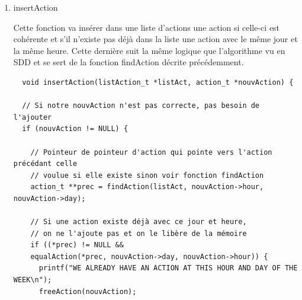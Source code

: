 \documentclass[11pt]{article}
\begin{document}
\begin{enumerate}
\begin{lstlisting}
   action_t **findAction(listAction_t *listAct, char hour[2], char day) {
  action_t **prec =
      NULL; // Pointeur d'un pointeur contenant l'action précédente
  if (checkHour(hour) && checkDay(day)) {
    prec = listAct;
    action_t *curr = *listAct; // Un pointeur vers notre action actuelle

    // Tant qu'on n'a pas trouvé l'action voulue et qu'on est avant
    // chronologiquement
    while (curr && compareAction(curr, day, hour)) {
      prec = &(curr->suiv);
      curr = curr->suiv;
    }
  }
  return prec;
}
\end{lstlisting}


\item insertAction
\label{sec:org713f212}

Cette fonction va insérer dans une liste d'actions une action si celle-ci
est cohérente et s'il n'existe pas déjà dans la liste une action avec le
même jour et la même heure.
Cette dernière suit la même logique que l'algorithme vu en SDD et se sert
de la fonction findAction décrite précédemment.

\begin{lstlisting}
  void insertAction(listAction_t *listAct, action_t *nouvAction) {

  // Si notre nouvAction n'est pas correcte, pas besoin de l'ajouter
  if (nouvAction != NULL) {

    // Pointeur de pointeur d'action qui pointe vers l'action précédant celle
    // voulue si elle existe sinon voir fonction findAction
    action_t **prec = findAction(listAct, nouvAction->hour, nouvAction->day);

    // Si une action existe déjà avec ce jour et heure,
    // on ne l'ajoute pas et on le libère de la mémoire
    if ((*prec) != NULL &&
	equalAction(*prec, nouvAction->day, nouvAction->hour)) {
      printf("WE ALREADY HAVE AN ACTION AT THIS HOUR AND DAY OF THE WEEK\n");
      freeAction(nouvAction);


\end{lstlisting}
\end{enumerate}
\end{document}
